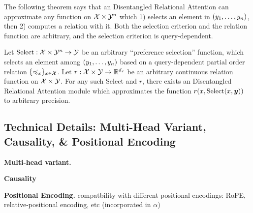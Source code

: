 The following theorem says that an Disentangled Relational Attention can approximate any function on ${\mathcal{X}} \times {\mathcal{Y}}^n$ which 1) selects an element in $(y_1, \ldots, y_n)$, then 2) computes a relation with it. Both the selection criterion and the relation function are arbitrary, and the selection criterion is query-dependent.
\begin{theorem}[Informal]
  Let $\mathrm{Select}: {\mathcal{X}} \times {\mathcal{Y}}^n \to {\mathcal{Y}}$ be an arbitrary ``preference selection'' function, which selects an element among $(y_1, \ldots, y_n)$ based on a query-dependent partial order relation $\{\preccurlyeq_x\}_{x \in {\mathcal{X}}}$. Let $r: {\mathcal{X}} \times {\mathcal{Y}} \to \mathbb{R}^{d_r}$ be an arbitrary continuous relation function on ${\mathcal{X}} \times {\mathcal{Y}}$. For any such $\mathrm{Select}$ and $r$, there exists an Disentangled Relational Attention module which approximates the function $r(x, \mathrm{Select}(x, \bm{y}))$ to arbitrary precision.
\end{theorem}

\subsection{Technical Details: Multi-Head Variant, Causality, \& Positional Encoding}

\textbf{Multi-head variant.}

\textbf{Causality}

\textbf{Positional Encoding.} compatbility with different positional encodings: RoPE, relative-positional encoding, etc (incorporated in $\alpha$)
